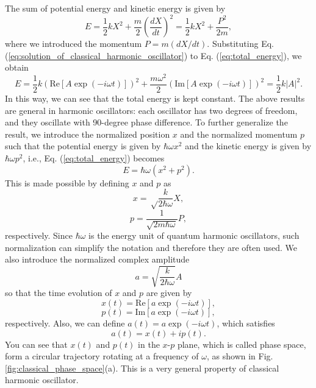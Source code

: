 \documentclass{book}
\begin{document}
The sum of potential energy and kinetic energy is given by
\begin{equation}
  E = \frac{1}{2}kX^2 + \frac{m}{2}\left(\frac{dX}{dt} \right)^2 = \frac{1}{2}kX^2 + \frac{P^2}{2m},
  \label{eq:total_energy}
\end{equation}
where we introduced the momentum $P = m(dX/dt)$. Substituting Eq. (\ref{eq:solution_of_classical_harmonic_oscillator}) to Eq. (\ref{eq:total_energy}), we obtain
\begin{equation}
  E= \frac{1}{2}k(\mathrm{Re} [A\exp(-i\omega t)])^2 + \frac{m\omega^2}{2} (\mathrm{Im} [A\exp(-i\omega t)])^2 = \frac{1}{2}k|A|^2.
\end{equation}
In this way, we can see that the total energy is kept constant.
The above results are general in harmonic oscillators: each oscillator has two degrees of freedom, and they oscillate with 90-degree phase difference. To further generalize the result, we introduce the normalized position $x$ and the normalized momentum $p$ such that the potential energy is given by $\hbar \omega x^2$ and the kinetic energy is given by $\hbar \omega p^2$, i.e., Eq. (\ref{eq:total_energy}) becomes
\begin{equation}
  E = \hbar \omega (x^2 + p^2).
\end{equation}
This is made possible by defining $x$ and $p$ as
\begin{equation}
  x = \sqrt \frac{k}{2\hbar\omega} X,
  \label{eq:normalized_position}
\end{equation}
\begin{equation}
  p = \frac{1}{\sqrt{2m\hbar \omega}}P,
  \label{eq:normalized_momentum}
\end{equation}
respectively. Since $\hbar \omega$ is the energy unit of quantum harmonic oscillators, such normalization can simplify the notation and therefore they are often used. We also introduce the normalized complex amplitude
\begin{equation}
  a = \sqrt{\frac{k}{2\hbar \omega}}A
\end{equation}
so that the time evolution of $x$ and $p$ are given by
\begin{equation}
  x(t) = \mathrm{Re}[a \exp(-i\omega t)],
\end{equation}
\begin{equation}
  p(t) = \mathrm{Im}[a \exp(-i\omega t)],
\end{equation}
respectively. Also, we can define $a(t) = a\exp(-i\omega t)$, which satisfies
\begin{equation}
  a(t) = x(t) + ip(t).
  \label{eq:normalized_complex_amplitude}
\end{equation}
You can see that $x(t)$ and $p(t)$ in the $x$-$p$ plane, which is called phase space, form a circular trajectory rotating at a frequency of $\omega$, as shown in Fig. {\ref{fig:classical_phase_space}}(a). This is a very general property of classical harmonic oscillator. 
\end{document}
